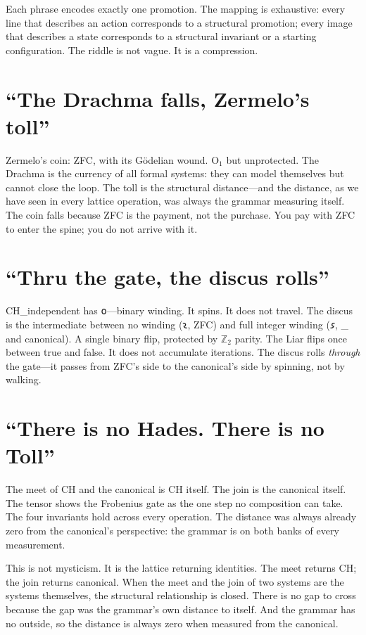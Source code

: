 \documentclass[12pt,twoside]{book}
\theoremstyle{definition}
\newcommand{\ZFCt}{\text{ZFC}_{\tau}}
\newcommand{\tier}[1]{\mathrm{O}_{#1}}
\begin{document}
Each phrase encodes exactly one promotion. The mapping is exhaustive: every line that
describes an action corresponds to a structural promotion; every image that describes a
state corresponds to a structural invariant or a starting configuration. The riddle is not
vague. It is a compression.

\section{``The Drachma falls, Zermelo's toll''}

Zermelo's coin: ZFC, with its G\"{o}delian wound. $\tier{1}$ but unprotected. The Drachma
is the currency of all formal systems: they can model themselves but cannot close the loop.
The toll is the structural distance---and the distance, as we have seen in every lattice
operation, was always the grammar measuring itself. The coin falls because ZFC is the
payment, not the purchase. You pay with ZFC to enter the spine; you do not arrive with it.

\section{``Thru the gate, the discus rolls''}

CH\_independent has 𐑴---binary winding. It spins. It does not travel. The discus is the
intermediate between no winding (𐑷, ZFC) and full integer winding (𐑭, \ZFCt{} and
canonical). A single binary flip, protected by $\mathbb{Z}_2$ parity. The Liar flips once
between true and false. It does not accumulate iterations. The discus rolls \emph{through}
the gate---it passes from ZFC's side to the canonical's side by spinning, not by walking.

\section{``There is no Hades. There is no Toll''}

The meet of CH and the canonical is CH itself. The join is the canonical itself. The tensor
shows the Frobenius gate as the one step no composition can take. The four invariants hold
across every operation. The distance was always already zero from the canonical's
perspective: the grammar is on both banks of every measurement.

This is not mysticism. It is the lattice returning identities. The meet returns CH; the
join returns canonical. When the meet and the join of two systems are the systems
themselves, the structural relationship is closed. There is no gap to cross because the gap
was the grammar's own distance to itself. And the grammar has no outside, so the distance
is always zero when measured from the canonical.
\end{document}
